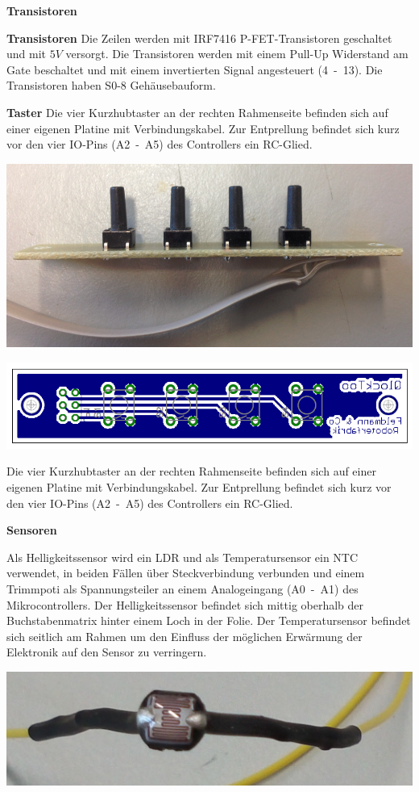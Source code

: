 \begin{multicols}{2}
\textbf{Transistoren}


\textbf{Transistoren} Die Zeilen werden mit IRF7416 P-FET-Transistoren geschaltet und mit $5V$ versorgt. Die Transistoren werden mit einem Pull-Up Widerstand am Gate beschaltet und mit einem invertierten Signal angesteuert (4~-~13). Die Transistoren haben S0-8 Gehäusebauform. 

\textbf{Taster} Die vier Kurzhubtaster an der rechten Rahmenseite befinden sich auf einer eigenen Platine mit Verbindungskabel. Zur Entprellung befindet sich kurz vor den vier IO-Pins (A2~-~A5) des Controllers ein RC-Glied. 

{
\centering 
\includegraphics[width=0.9\columnwidth]{Abbildungen/Konstruktion/Taster02} 

}

{
\centering 
\includegraphics[width=0.8\columnwidth]{Abbildungen/Elektronik/Taster01} 

}

Die vier Kurzhubtaster an der rechten Rahmenseite befinden sich auf einer eigenen Platine mit Verbindungskabel. Zur Entprellung befindet sich kurz vor den vier IO-Pins (A2~-~A5) des Controllers ein RC-Glied. 

\textbf{Sensoren}

Als Helligkeitssensor wird ein LDR und als Temperatursensor ein NTC verwendet, in beiden Fällen über Steckverbindung verbunden und einem Trimmpoti als Spannungsteiler an einem Analogeingang (A0~-~A1) des Mikrocontrollers. Der Helligkeitssensor befindet sich mittig oberhalb der Buchstabenmatrix hinter einem Loch in der Folie. Der Temperatursensor befindet sich seitlich am Rahmen um den Einfluss der möglichen Erwärmung der Elektronik auf den Sensor zu verringern. \newline
{
\centering 
\includegraphics[width=0.9\columnwidth]{Abbildungen/Elektronik/LDR} 

}
\end{multicols}
